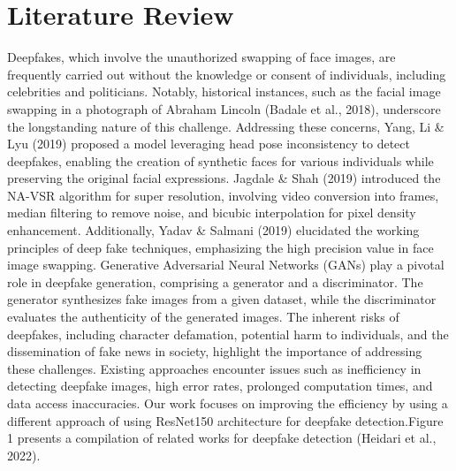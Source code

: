 \chapter{Literature Review}
Deepfakes, which involve the unauthorized swapping of face images, are frequently carried out without the knowledge or consent of individuals, including celebrities and politicians. Notably, historical instances, such as the facial image swapping in a photograph of Abraham Lincoln (Badale et al., 2018), underscore the longstanding nature of this challenge. Addressing these concerns, Yang, Li \& Lyu (2019) proposed a model leveraging head pose inconsistency to detect deepfakes, enabling the creation of synthetic faces for various individuals while preserving the original facial expressions.
Jagdale \& Shah (2019) introduced the NA-VSR algorithm for super resolution, involving video conversion into frames, median filtering to remove noise, and bicubic interpolation for pixel density enhancement. Additionally, Yadav \& Salmani (2019) elucidated the working principles of deep fake techniques, emphasizing the high precision value in face image swapping.
Generative Adversarial Neural Networks (GANs) play a pivotal role in deepfake generation, comprising a generator and a discriminator. The generator synthesizes fake images from a given dataset, while the discriminator evaluates the authenticity of the generated images. The inherent risks of deepfakes, including character defamation, potential harm to individuals, and the dissemination of fake news in society, highlight the importance of addressing these challenges.
Existing approaches encounter issues such as inefficiency in detecting deepfake images, high error rates, prolonged computation times, and data access inaccuracies. Our work focuses on improving the efficiency by using a different approach of using ResNet150 architecture for deepfake detection.Figure 1 presents a compilation of related works for deepfake detection (Heidari et al., 2022).

